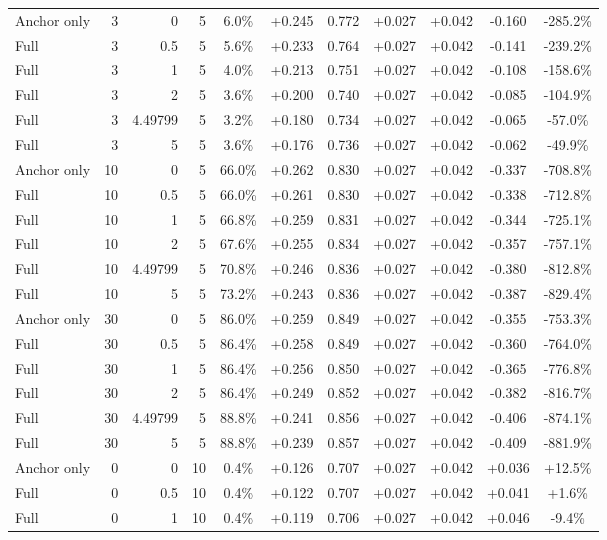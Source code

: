 \begin{table}[htbp]
\begin{tabular}{lrrrccccccc}
Anchor only & 3 & 0 & 5 & 6.0\% & +0.245 & 0.772 & +0.027 & +0.042 & -0.160 & -285.2\% \\
Full & 3 & 0.5 & 5 & 5.6\% & +0.233 & 0.764 & +0.027 & +0.042 & -0.141 & -239.2\% \\
Full & 3 & 1 & 5 & 4.0\% & +0.213 & 0.751 & +0.027 & +0.042 & -0.108 & -158.6\% \\
Full & 3 & 2 & 5 & 3.6\% & +0.200 & 0.740 & +0.027 & +0.042 & -0.085 & -104.9\% \\
Full & 3 & 4.49799 & 5 & 3.2\% & +0.180 & 0.734 & +0.027 & +0.042 & -0.065 & -57.0\% \\
Full & 3 & 5 & 5 & 3.6\% & +0.176 & 0.736 & +0.027 & +0.042 & -0.062 & -49.9\% \\
Anchor only & 10 & 0 & 5 & 66.0\% & +0.262 & 0.830 & +0.027 & +0.042 & -0.337 & -708.8\% \\
Full & 10 & 0.5 & 5 & 66.0\% & +0.261 & 0.830 & +0.027 & +0.042 & -0.338 & -712.8\% \\
Full & 10 & 1 & 5 & 66.8\% & +0.259 & 0.831 & +0.027 & +0.042 & -0.344 & -725.1\% \\
Full & 10 & 2 & 5 & 67.6\% & +0.255 & 0.834 & +0.027 & +0.042 & -0.357 & -757.1\% \\
Full & 10 & 4.49799 & 5 & 70.8\% & +0.246 & 0.836 & +0.027 & +0.042 & -0.380 & -812.8\% \\
Full & 10 & 5 & 5 & 73.2\% & +0.243 & 0.836 & +0.027 & +0.042 & -0.387 & -829.4\% \\
Anchor only & 30 & 0 & 5 & 86.0\% & +0.259 & 0.849 & +0.027 & +0.042 & -0.355 & -753.3\% \\
Full & 30 & 0.5 & 5 & 86.4\% & +0.258 & 0.849 & +0.027 & +0.042 & -0.360 & -764.0\% \\
Full & 30 & 1 & 5 & 86.4\% & +0.256 & 0.850 & +0.027 & +0.042 & -0.365 & -776.8\% \\
Full & 30 & 2 & 5 & 86.4\% & +0.249 & 0.852 & +0.027 & +0.042 & -0.382 & -816.7\% \\
Full & 30 & 4.49799 & 5 & 88.8\% & +0.241 & 0.856 & +0.027 & +0.042 & -0.406 & -874.1\% \\
Full & 30 & 5 & 5 & 88.8\% & +0.239 & 0.857 & +0.027 & +0.042 & -0.409 & -881.9\% \\
Anchor only & 0 & 0 & 10 & 0.4\% & +0.126 & 0.707 & +0.027 & +0.042 & +0.036 & +12.5\% \\
Full & 0 & 0.5 & 10 & 0.4\% & +0.122 & 0.707 & +0.027 & +0.042 & +0.041 & +1.6\% \\
Full & 0 & 1 & 10 & 0.4\% & +0.119 & 0.706 & +0.027 & +0.042 & +0.046 & -9.4\% \\

\end{tabular}
\end{table}
